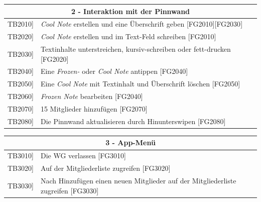 \documentclass[a4paper]{scrreprt}
\begin{document}
	    \vspace{5mm}
	    
	    \begin{table}[h!]
	    	\centering
	    	\label{my-label}
	    	\begin{tabular}{p{2cm}p{12cm}}
	    		
	    		\multicolumn{2}{c}{\textbf{2 - Interaktion mit der Pinnwand}} \\ \hline
	    		\centering{[}TB2010{]} & \textit{Cool Note} erstellen und eine Überschrift geben {[}FG2010{]}{[}FG2030{]}\\
	    		\centering{[}TB2020{]} & \textit{Cool Note} erstellen und im Text-Feld schreiben {[}FG2010{]}\\
	    		\centering{[}TB2030{]} & Textinhalte unterstreichen, kursiv-schreiben oder fett-drucken {[}FG2020{]}\\
	    		\centering{[}TB2040{]} & Eine \textit{Frozen-} oder \textit{Cool Note} antippen {[}FG2040{]}\\ 
	    		\centering{[}TB2050{]} & Eine \textit{Cool Note} mit Textinhalt und Überschrift löschen {[}FG2050{]}\\ 
	    		\centering{[}TB2060{]} & \textit{Frozen Note} bearbeiten {[}FG2040{]}\\ 
				\centering{[}TB2070{]} & 15 Mitglieder hinzufügen {[}FG2070{]}\\ 

	    		\centering{[}TB2080{]} & Die Pinnwand aktualisieren durch Hinunterswipen {[}FG2080{]}\\ 
	    		\hline
	    	\end{tabular}
	    \end{table}
	    
	    \vspace{5mm}
	    
	    \begin{table}[h!]
	    	\centering
	    	\label{my-label}
	    	\begin{tabular}{p{2cm}p{12cm}}
	    		
	    		\multicolumn{2}{c}{\textbf{3 - App-Menü}} \\ \hline
	    		\centering{[}TB3010{]} & Die WG verlassen {[}FG3010{]}\\
	    		\centering{[}TB3020{]} & Auf der Mitgliederliste zugreifen {[}FG3020{]}\\
	    		\centering{[}TB3030{]} & Nach Hinzufügen einen neuen Mitglieder auf der Mitgliederliste zugreifen {[}FG3030{]}\\
	    		\hline
	    	\end{tabular}
	    \end{table}
	    
\end{document}
